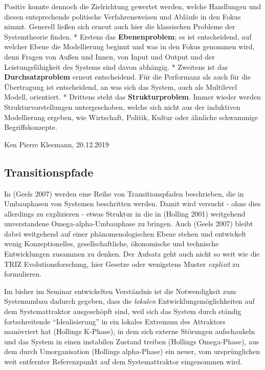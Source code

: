 \documentclass[11pt,a4paper]{article}
\begin{document}
Positiv konnte dennoch die Zielrichtung gewertet werden, welche
Handlungen und diesen entsprechende politische Verfahrensweisen und
Abläufe in den Fokus nimmt. Generell ließen sich erneut auch hier die
klassischen Probleme der Systemtheorie finden. * Erstens das
\textbf{Ebenenproblem}; es ist entscheidend, auf welcher Ebene die
Modellierung beginnt und was in den Fokus genommen wird, denn Fragen von
Außen und Innen, von Input und Output und der Leistungsfähigkeit des
Systems sind davon abhängig. * Zweitens ist das
\textbf{Durchsatzproblem} erneut entscheidend. Für die Performanz als
auch für die Übertragung ist entscheidend, an was sich das System, auch
als Multilevel Modell, orientiert. * Drittens steht das
\textbf{Strukturproblem}. Immer wieder werden Strukturvorstellungen
untergeschoben, welche sich nicht aus der induktiven Modellierung
ergeben, wie Wirtschaft, Politik, Kultur oder ähnliche schwammige
Begriffskonzepte.

Ken Pierre Kleemann, 20.12.2019

\hypertarget{transitionspfade}{%
\subsection{Transitionspfade}\label{transitionspfade}}

In (Geels 2007) werden eine Reihe von Transitionspfaden beschrieben, die
in Umbauphasen von Systemen beschritten werden. Damit wird versucht -
ohne dies allerdings zu explizieren - etwas Struktur in die in (Holling
2001) weitgehend unverstandene Omega-alpha-Umbauphase zu bringen. Auch
(Geels 2007) bleibt dabei weitgehend auf einer phänomenologischen Ebene
stehen und entwickelt wenig Konzeptionelles, gesellschaftliche,
ökonomische und technische Entwicklungen zusammen zu denken. Der Aufsatz
geht auch nicht so weit wie die TRIZ Evolutionsforschung, hier Gesetze
oder wenigstens Muster \emph{explizit} zu formulieren.

Im bisher im Seminar entwickelten Verständnis ist die Notwendigkeit zum
Systemumbau dadurch gegeben, dass die \emph{lokalen}
Entwicklungsmöglichkeiten auf dem Systemattraktor ausgeschöpft sind,
weil sich das System durch ständig fortschreitende ``Idealisierung'' in
ein lokales Extremum des Attraktors manövriert hat (Hollings K-Phase),
in dem sich externe Störungen aufschaukeln und das System in einen
instabilen Zustand treiben (Hollings Omega-Phase), aus dem durch
Umorganisation (Hollings alpha-Phase) ein neuer, vom ursprünglichen weit
entfernter Referenzpunkt auf dem Systemattraktor eingenommen wird.
\end{document}
